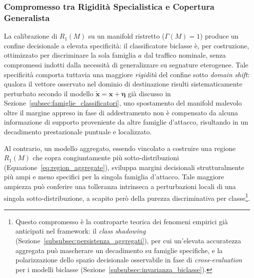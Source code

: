 \subsubsection{Compromesso tra Rigidità Specialistica e Copertura Generalista}
\label{subsubsec:compromesso_rigidita}
La calibrazione di $R_1(M)$ su un manifold ristretto ($\Gamma(M)=1$) produce un confine decisionale a elevata specificità: il classificatore biclasse è, per costruzione, ottimizzato per discriminare la sola famiglia $a$ dal traffico nominale, senza compromessi indotti dalla necessità di generalizzare su segnature eterogenee. Tale specificità comporta tuttavia una maggiore \textit{rigidità} del confine sotto \textit{domain shift}: qualora il vettore osservato nel dominio di destinazione risulti sistematicamente perturbato secondo il modello $\tilde{\mathbf{x}} = \mathbf{x} + \boldsymbol{\eta}$ già discusso in Sezione~\ref{subsec:famiglie_classificatori}, uno spostamento del manifold malevolo oltre il margine appreso in fase di addestramento non è compensato da alcuna informazione di supporto proveniente da altre famiglie d'attacco, risultando in un decadimento prestazionale puntuale e localizzato.

Al contrario, un modello aggregato, essendo vincolato a costruire una regione $R_1(M)$ che copra congiuntamente più sotto-distribuzioni (Equazione~\eqref{eq:region_aggregate}), sviluppa margini decisionali strutturalmente più ampi e meno specifici per la singola famiglia d'attacco. Tale maggiore ampiezza può conferire una tolleranza intrinseca a perturbazioni locali di una singola sotto-distribuzione, a scapito però della purezza discriminativa per classe\footnote{Questo compromesso è la controparte teorica dei fenomeni empirici già anticipati nel framework: il \textit{class shadowing} (Sezione~\ref{subsubsec:persistenza_aggregati}), per cui un'elevata accuratezza aggregata può mascherare un decadimento su famiglie specifiche, e la polarizzazione dello spazio decisionale osservabile in fase di \textit{cross-evaluation} per i modelli biclasse (Sezione~\ref{subsubsec:invarianza_biclasse}).}.

